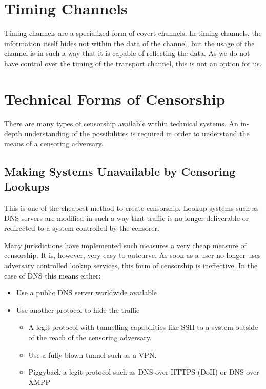 \section{Timing Channels}

Timing channels are a specialized form of covert channels. In timing channels, the information itself hides not within the data of the channel, but the usage of the channel is in such a way that it is capable of reflecting the data. As we do not have control over the timing of the transport channel, this is not an option for us.

\section{Technical Forms of Censorship}
There are many types of censorship available within technical systems. An in-depth understanding of the possibilities is required in order to understand the means of a censoring adversary.

\subsection{Making Systems Unavailable by Censoring Lookups}
This is one of the cheapest method to create censorship. Lookup systems such as DNS servers are modified in such a way that traffic is no longer deliverable or redirected to a system controlled by the censorer.

Many jurisdictions have implemented such measures a very cheap measure of censorship. It is, however, very easy to outcurve. As soon as a user no longer uses adversary controlled lookup services, this form of censorship is ineffective. In the case of DNS this means either: 

\begin{itemize}
	\item Use a public DNS server worldwide available
	\item Use another protocol to hide the traffic 
	\begin{itemize}
		\item A legit protocol with tunnelling capabilities like SSH to a system outside of the reach of the censoring adversary.
		\item Use a fully blown tunnel such as a VPN.
		\item Piggyback a legit protocol such as DNS-over-HTTPS (DoH)\cite{rfc8484} or DNS-over-XMPP\cite{xep0418}
	\end{itemize}
\end{itemize}

